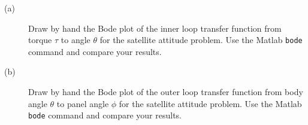 
\begin{description}
\item[(a)] Draw by hand the Bode plot of the inner loop transfer function from torque $\tau$ to angle $\theta$ for the satellite attitude problem.
Use the Matlab \texttt{bode} command and compare your results.
\item[(b)] Draw by hand the Bode plot of the outer loop transfer function from body angle $\theta$ to panel angle $\phi$ for the satellite attitude problem.
Use the Matlab \texttt{bode} command and compare your results.
\end{description}